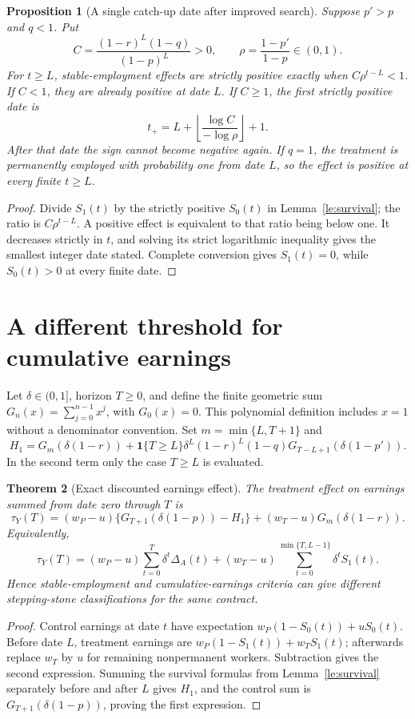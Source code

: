 \documentclass[11pt,a4paper]{article}
\newtheorem{theorem}{Theorem}[section]
\newtheorem{proposition}[theorem]{Proposition}
\theoremstyle{definition}
\theoremstyle{remark}
\newcommand{\ind}{\mathbf 1}
\begin{document}
\begin{proposition}[A single catch-up date after improved search]
Suppose $p'>p$ and $q<1$. Put
\[
 C=\frac{(1-r)^L(1-q)}{(1-p)^L}>0,
 \qquad \rho=\frac{1-p'}{1-p}\in(0,1).
\]
For $t\geq L$, stable-employment effects are strictly positive exactly when
$C\rho^{t-L}<1$. If $C<1$, they are already positive at date $L$. If $C\geq1$, the first strictly positive date is
\[
 t_+=L+\left\lfloor\frac{\log C}{-\log\rho}\right\rfloor+1.
\]
After that date the sign cannot become negative again. If $q=1$, the treatment is permanently employed with probability one from date $L$, so the effect is positive at every finite $t\geq L$.
\end{proposition}
\begin{proof}
Divide $S_1(t)$ by the strictly positive $S_0(t)$ in Lemma~\ref{le:survival}; the ratio is $C\rho^{t-L}$. A positive effect is equivalent to that ratio being below one. It decreases strictly in $t$, and solving its strict logarithmic inequality gives the smallest integer date stated. Complete conversion gives $S_1(t)=0$, while $S_0(t)>0$ at every finite date.
\end{proof}

\section{A different threshold for cumulative earnings}
Let $\delta\in(0,1]$, horizon $T\geq0$, and define the finite geometric sum
$G_n(x)=\sum_{j=0}^{n-1}x^j$, with $G_0(x)=0$. This polynomial definition includes $x=1$ without a denominator convention. Set $m=\min\{L,T+1\}$ and
\[
 H_1=G_m(\delta(1-r))
 +\ind\{T\geq L\}\delta^L(1-r)^L(1-q)
                   G_{T-L+1}(\delta(1-p')).
\]
In the second term only the case $T\geq L$ is evaluated.

\begin{theorem}[Exact discounted earnings effect]\label{th:earnings}
The treatment effect on earnings summed from date zero through $T$ is
\[
 \tau_Y(T)=(w_P-u)\{G_{T+1}(\delta(1-p))-H_1\}
                  +(w_T-u)G_m(\delta(1-r)).
\]
Equivalently,
\[
 \tau_Y(T)=(w_P-u)\sum_{t=0}^T\delta^t\Delta_A(t)
       +(w_T-u)\sum_{t=0}^{\min\{T,L-1\}}\delta^tS_1(t).
\]
Hence stable-employment and cumulative-earnings criteria can give different stepping-stone classifications for the same contract.
\end{theorem}
\begin{proof}
Control earnings at date $t$ have expectation
$w_P(1-S_0(t))+uS_0(t)$. Before date $L$, treatment earnings are
$w_P(1-S_1(t))+w_TS_1(t)$; afterwards replace $w_T$ by $u$ for remaining nonpermanent workers. Subtraction gives the second expression. Summing the survival formulas from Lemma~\ref{le:survival} separately before and after $L$ gives $H_1$, and the control sum is $G_{T+1}(\delta(1-p))$, proving the first expression.
\end{proof}
\end{document}
